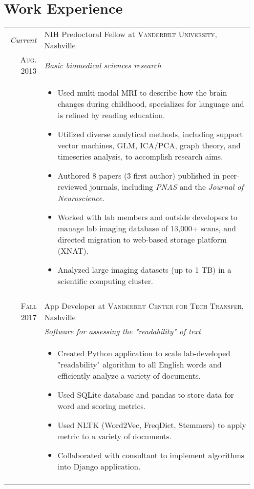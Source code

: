 \documentclass[a4paper,10pt]{article}
\begin{document}
\section{Work Experience}
\begin{tabular}{r|p{11cm}}
 
 	\emph{Current} & NIH Predoctoral Fellow at \textsc{Vanderbilt University}, Nashville \\
 	\textsc{Aug. 2013}&\emph{Basic biomedical sciences research}\\
 	&\footnotesize{
 	\begin{itemize}
    	\item Used multi-modal MRI to describe how the brain changes during childhood, specializes for language and is refined by reading education.
    	\item Utilized diverse analytical methods, including support vector machines, GLM, ICA/PCA, graph theory, and timeseries analysis, to accomplish research aims.
        \item Authored 8 papers (3 first author) published in peer-reviewed journals,  including  \textit{PNAS} and the  \textit{Journal of Neuroscience}.
        \item Worked with lab members and outside developers to manage lab imaging database of 13,000+ scans, and directed migration to web-based storage platform (XNAT).
        \item Analyzed large imaging datasets (up to 1 TB) in a scientific computing cluster.
	\end{itemize}}\\
	\multicolumn{2}{c}{} \\
    
	\textsc{Fall} 2017 & App Developer at \textsc{Vanderbilt Center for Tech Transfer}, Nashville \\
	&\emph{Software for assessing the "readability" of text}\\
	&\footnotesize{
	\begin{itemize}
	    \item Created Python application to scale lab-developed "readability" algorithm to all English words and efficiently analyze a variety of documents. 
	    \item Used SQLite database and pandas to store data for word and scoring metrics.
	    \item Used NLTK (Word2Vec, FreqDict, Stemmers) to apply metric to a variety of documents.
	    \item Collaborated with consultant to implement algorithms into Django application. 
    \end{itemize}}\\
 	\multicolumn{2}{c}{} \\


\end{tabular}
\end{document}
